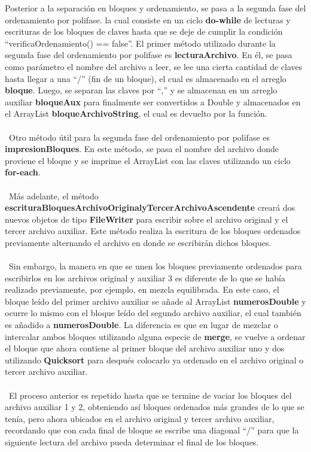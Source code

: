 \documentclass[12pt,letterpaper]{report}
\begin{document}
Posterior a la separación en bloques y ordenamiento, se pasa a la segunda fase del ordenamiento por polifase. la cual consiste en un ciclo \textbf{do-while} de lecturas y escrituras de los bloques de claves hasta que se deje de cumplir la condición “verificaOrdenamiento() == false”. El primer método utilizado durante la segunda fase del ordenamiento por polifase es \textbf{lecturaArchivo}. En él, se pasa como parámetro el nombre del archivo a leer, se lee una cierta cantidad de claves hasta llegar a una “/” (fin de un bloque), el cual es almacenado en el arreglo \textbf{bloque}. Luego, se separan las claves por “,” y se almacenan en un arreglo auxiliar \textbf{bloqueAux} para finalmente ser convertidos a Double y almacenados en el ArrayList \textbf{bloqueArchivoString}, el cual es devuelto por la función.\\\\\
Otro método útil para la segunda fase del ordenamiento por polifase es \textbf{impresionBloques}. En este método, se pasa el nombre del archivo donde proviene el bloque y se imprime el ArrayList con las claves utilizando un ciclo \textbf{for-each}.\\\\\ Más adelante, el método \textbf{escrituraBloquesArchivoOriginalyTercerArchivoAscendente} creará dos nuevos objetos de tipo \textbf{FileWriter} para escribir sobre el archivo original y el tercer archivo auxiliar. Este método realiza la escritura de los bloques ordenados previamente alternando el archivo en donde se escribirán dichos bloques.\\\\\
Sin embargo, la manera en que se unen los bloques previamente ordenados para escribirlos en los archivos original y auxiliar 3 es diferente de lo que se había realizado previamente, por ejemplo, en mezcla equilibrada. En este caso, el bloque leído del primer archivo auxiliar se añade al ArrayList \textbf{numerosDouble} y ocurre lo mismo con el bloque leído del segundo archivo auxiliar, el cual también es añadido a \textbf{numerosDouble}. La diferencia es que en lugar de mezclar o intercalar ambos bloques utilizando alguna especie de \textbf{merge}, se vuelve a ordenar el bloque que ahora contiene al primer bloque del archivo auxiliar uno y dos utilizando \textbf{Quicksort} para después colocarlo ya ordenado en el archivo original o tercer archivo auxiliar.\\\\\
El proceso anterior es repetido hasta que se termine de vaciar los bloques del archivo auxiliar 1 y 2, obteniendo así bloques ordenados más grandes de lo que se tenía, pero ahora ubicados en el archivo original y tercer archivo auxiliar, recordando que con cada final de bloque se escribe una diagonal “/” para que la siguiente lectura del archivo pueda determinar el final de los bloques.\\\\\
\end{document}
